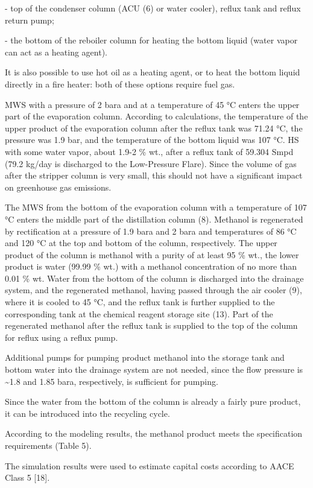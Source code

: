\begin{multicols}{2}
- top of the condenser column (ACU (6) or water cooler), reflux tank and
reflux return pump;

- the bottom of the reboiler column for heating the bottom liquid (water
vapor can act as a heating agent).

It is also possible to use hot oil as a heating agent, or to heat the
bottom liquid directly in a fire heater: both of these options require
fuel gas.

MWS with a pressure of 2 bara and at a temperature of 45 °C enters the
upper part of the evaporation column. According to calculations, the
temperature of the upper product of the evaporation column after the
reflux tank was 71.24 °C, the pressure was 1.9 bar, and the temperature
of the bottom liquid was 107 °C. HS with some water
vapor, about 1.9-2 \% wt., after a reflux tank of 59.304
Smpd (79.2 kg/day is discharged to the Low-Pressure
Flare). Since the volume of gas after the stripper column is very small,
this should not have a significant impact on greenhouse gas emissions.

The MWS from the bottom of the evaporation column with a temperature of
107 °C enters the middle part of the distillation column (8). Methanol
is regenerated by rectification at a pressure of 1.9 bara and 2 bara and
temperatures of 86 °C and 120 °C at the top and bottom of the column,
respectively. The upper product of the column is methanol with a purity
of at least 95 \% wt., the lower product is water (99.99 \% wt.) with a
methanol concentration of no more than 0.01 \% wt. Water from the bottom
of the column is discharged into the drainage system, and the
regenerated methanol, having passed through the air cooler (9), where it
is cooled to 45 °C, and the reflux tank is further supplied to the
corresponding tank at the chemical reagent storage site (13). Part of
the regenerated methanol after the reflux tank is supplied to the top of
the column for reflux using a reflux pump.

Additional pumps for pumping product methanol into the storage tank and
bottom water into the drainage system are not needed, since the flow
pressure is \textasciitilde1.8 and 1.85 bara, respectively, is
sufficient for pumping.

Since the water from the bottom of the column is already a fairly pure
product, it can be introduced into the recycling cycle.

According to the modeling results, the methanol product meets the
specification requirements (Table 5).

The simulation results were used to estimate capital costs according to
AACE Class 5 {[}18{]}.
\end{multicols}

